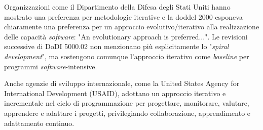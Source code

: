 Organizzazioni come il Dipartimento della Difesa degli Stati Uniti hanno mostrato una preferenza per metodologie iterative e la \gls{dod}\glsfirstoccur del 2000 esponeva chiaramente una preferenza per un approccio evolutivo/iterativo alla realizzazione delle capacità \emph{software}: "An evolutionary approach is preferred...". Le revisioni successive di DoDI 5000.02 non menzionano più esplicitamente lo "\emph{spiral development}", ma sostengono comunque l'approccio iterativo come \emph{baseline} per programmi \emph{software}-intensive.

Anche agenzie di sviluppo internazionale, come la United States Agency for International Development (USAID), adottano un approccio iterativo e incrementale nel ciclo di programmazione per progettare, monitorare, valutare, apprendere e adattare i progetti, privilegiando collaborazione, apprendimento e adattamento continuo.

